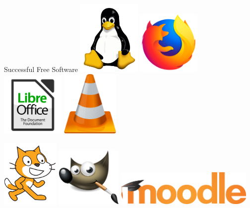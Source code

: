 \documentclass[pdf]{beamer}
\begin{document}
\begin{frame}{Successful Free Software}
  \center
  \includegraphics[width=0.23\textwidth]{Tux.png}
  \includegraphics[width=0.23\textwidth]{Firefox.png}
  \includegraphics[width=0.23\textwidth]{Libre-Office.png}
  \includegraphics[width=0.21\textwidth]{VLC.png}

  \includegraphics[width=0.21\textwidth]{Scratch.png}
  \includegraphics[width=0.24\textwidth]{Gimp.png}
  \includegraphics[width=0.5\textwidth]{moodle.png}
\end{frame}
\end{document}
